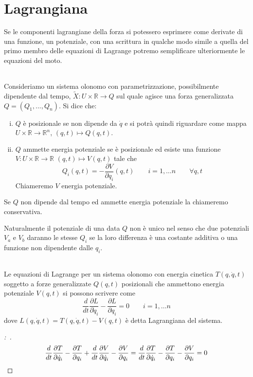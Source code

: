\documentclass[11pt,a4paper,twoside]{book}
\newenvironment{proposizione}[1][\empty]{\begin{Proposizione}{
\ifx\empty#1\relax\else\mdseries\itshape#1\\\fi
}{}}{\end{Proposizione}}
\newenvironment{definizione}[1][\empty]{\begin{Definizione}{
\ifx\empty#1\relax\else\mdseries\itshape#1\\\fi
}{}}{\end{Definizione}}
\newenvironment{dimo}[1][\proofname]{
	\begin{tcolorbox}[
	breakable, 
	enhanced, 
	interior hidden, 
	frame hidden, 
	borderline west = {1pt}{0pt}{gray}, 
	top=0pt, bottom=0pt, left=0pt]
\begin{proof}[#1:~]
}
{
\end{proof}
\end{tcolorbox}
}
\theoremstyle{esss}
\theoremstyle{dotless}
\numberwithin{equation}{section} %
\begin{document}
\section{Lagrangiana}
Se le componenti lagrangiane della forza si potessero esprimere come derivate di una funzione, un potenziale, con una scrittura in qualche modo simile a quella del primo membro delle equazioni di Lagrange potremo semplificare ulteriormente le equazioni del moto.

\begin{definizione}
Consideriamo un sistema olonomo con parametrizzazione, possibilmente dipendente dal tempo, $\tilde{X} : U \times \mathbb{R}\rightarrow Q$ sul quale agisce una
forza generalizzata $Q = (Q_1, . . . , Q_n)$. Si dice che:\begin{enumerate}[i.]
\item $Q$ è posizionale se non dipende da $\dot{q}$ e si potrà quindi riguardare come mappa $U\times\mathbb{R}\rightarrow\mathbb{R}^n$, $(q,t)\mapsto Q(q,t)$.
\item $Q$ ammette energia potenziale se è posizionale ed esiste una funzione $V:U\times\mathbb{R}\rightarrow\mathbb{R}$ $(q,t)\mapsto V(q,t)$ tale che
\[
Q_i (q,t) = -\dfrac{\partial V}{\partial q_i}(q,t) \qquad i=1,\dots n \qquad \forall q,t
\]
Chiameremo $V$ energia potenziale.
\end{enumerate}
Se $Q$ non dipende dal tempo ed ammette energia potenziale la chiameremo conservativa.
\end{definizione}

Naturalmente il potenziale di una data $Q$ non è unico nel senso che due potenziali $V_a$ e $V_b$ daranno le stesse $Q_i$ se la loro differenza è una costante additiva o una funzione non dipendente dalle $q_i$.

\begin{proposizione}
Le equazioni di Lagrange per un sistema olonomo con energia cinetica $T(q,\dot{q},t)$ soggetto a forze generalizzate $Q(q,t)$ posizionali che ammettono energia potenziale $V(q,t)$ si possono scrivere come
\begin{equation}
\dfrac{d}{dt}\dfrac{\partial L}{\partial \dot{q}_i} - \dfrac{\partial L}{\partial q_i}=0 \qquad i=1,\dots n
\end{equation}
dove $L(q,\dot{q},t)=T(q,\dot{q},t)-V(q,t)$ è detta Lagrangiana del sistema.
\end{proposizione}
\begin{dimo}
\[
\dfrac{d}{dt}\dfrac{\partial T}{\partial \dot{q}_i} - \dfrac{\partial T}{\partial q_i}+\dfrac{d}{dt}\dfrac{\partial V}{\partial \dot{q}_i} - \dfrac{\partial V}{\partial q_i}=
\dfrac{d}{dt}\dfrac{\partial T}{\partial \dot{q}_i} - \dfrac{\partial T}{\partial q_i}- \dfrac{\partial V}{\partial q_i}=0 \qedhere
\]
\end{dimo}
\end{document}
